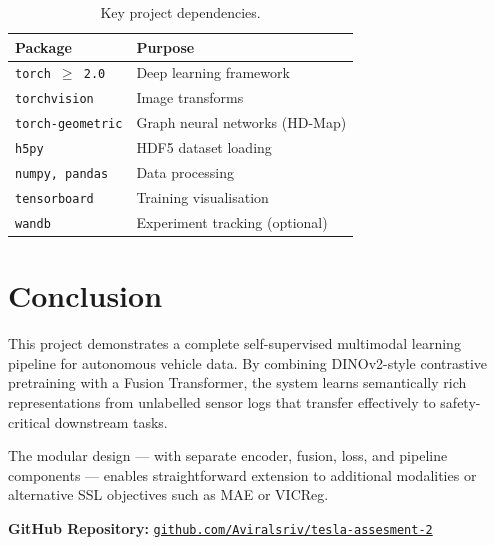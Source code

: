 \documentclass[12pt,a4paper]{article}
\begin{document}
\begin{table}[H]
\centering
\renewcommand{\arraystretch}{1.3}
\begin{tabular}{ll}
\toprule
\textbf{Package} & \textbf{Purpose} \\
\midrule
\texttt{torch $\geq$ 2.0}       & Deep learning framework \\
\texttt{torchvision}             & Image transforms \\
\texttt{torch-geometric}         & Graph neural networks (HD-Map) \\
\texttt{h5py}                    & HDF5 dataset loading \\
\texttt{numpy, pandas}           & Data processing \\
\texttt{tensorboard}             & Training visualisation \\
\texttt{wandb}                   & Experiment tracking (optional) \\
\bottomrule
\end{tabular}
\caption{Key project dependencies.}
\end{table}

\section{Conclusion}

This project demonstrates a complete self-supervised multimodal learning pipeline for
autonomous vehicle data. By combining DINOv2-style contrastive pretraining with a
Fusion Transformer, the system learns semantically rich representations from unlabelled
sensor logs that transfer effectively to safety-critical downstream tasks.

The modular design — with separate encoder, fusion, loss, and pipeline components —
enables straightforward extension to additional modalities or alternative SSL objectives
such as MAE or VICReg.

\vspace{1em}
\begin{tcolorbox}[colback=darkBlue!5, colframe=darkBlue]
\textbf{GitHub Repository:}
\href{https://github.com/Aviralsriv/tesla-assesment-2}{\texttt{github.com/Aviralsriv/tesla-assesment-2}}
\end{tcolorbox}

\end{document}
